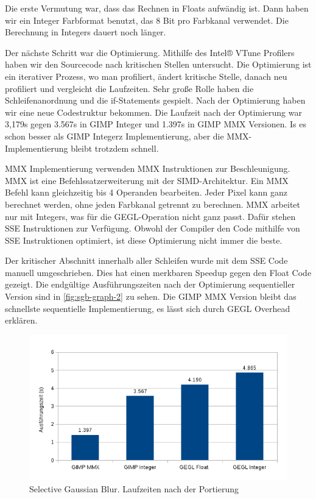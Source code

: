 Die erste Vermutung war, dass das Rechnen in Floats aufwändig ist. Dann haben wir ein Integer Farbformat benutzt, das 8 Bit pro Farbkanal verwendet. Die Berechnung in Integers dauert noch länger.

Der nächste Schritt war die Optimierung. Mithilfe des Intel® VTune Profilers haben wir den Sourcecode nach kritischen Stellen untersucht. Die Optimierung ist ein iterativer Prozess, wo man profiliert, ändert kritische Stelle, danach neu profiliert und vergleicht die Laufzeiten. Sehr große Rolle haben die Schleifenanordnung  und die if-Statements gespielt. Nach der Optimierung haben wir eine neue Codestruktur bekommen. Die Laufzeit nach der Optimierung war 3,179s gegen 3.567s in GIMP Integer und 1.397s in GIMP MMX Versionen. Is es schon besser als GIMP Integerz Implementierung, aber die MMX-Implementierung bleibt trotzdem schnell.

MMX Implementierung verwenden MMX Instruktionen zur Beschleunigung. MMX ist eine Befehlssatzerweiterung mit der SIMD-Architektur. Ein MMX Befehl kann gleichzeitig bis 4 Operanden bearbeiten. Jeder Pixel kann ganz berechnet werden, ohne jeden Farbkanal getrennt zu berechnen. MMX arbeitet nur mit Integers, was für die GEGL-Operation nicht ganz passt. Dafür stehen SSE Instruktionen zur Verfügung. Obwohl der Compiler den Code mithilfe von SSE Instruktionen optimiert, ist diese Optimierung nicht immer die beste.

Der kritischer Abschnitt innerhalb aller Schleifen wurde mit dem SSE Code manuell umgeschrieben. Dies hat einen merkbaren Speedup gegen den Float Code
gezeigt. Die endgültige Ausführungszeiten nach der Optimierung sequentieller Version sind in \autoref{fig:sgb-graph-2} zu sehen. Die GIMP MMX Version bleibt das schnellste sequentielle Implementierung, es lässt sich durch GEGL Overhead erklären.
\begin{figure}
\centering
\includegraphics[scale=0.75]{graphs/sgb-graph-1.png}
\caption{Selective Gaussian Blur. Laufzeiten nach der Portierung}
\label{fig:sgb-graph-1}
\end{figure} 

